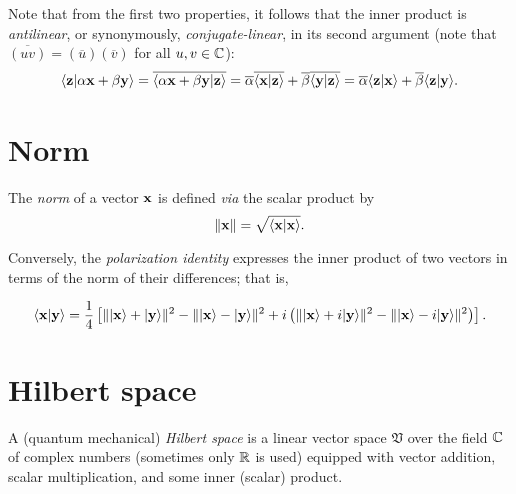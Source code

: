 Note that from the first two properties, it follows that the inner product is
{\em antilinear}, or synonymously,
{\em conjugate-linear}, in its second argument (note that $\overline{(uv)}=(\overline{u}) (\overline{v})$ for all $u,v\in {\Bbb C}$):
\begin{equation}
\begin{split}
 \langle  {\bf z} \vert \alpha {\bf x} + \beta {\bf y} \rangle
 =
 \overline{\langle \alpha {\bf x} + \beta {\bf y} \vert  {\bf z} \rangle }
 =
 \overline{ \alpha}\overline{\langle {\bf x} \vert  {\bf z}\rangle}
 + \overline{\beta }\overline{\langle {\bf y} \vert  {\bf z}\rangle}
 =
 \overline{\alpha} {\langle {\bf z}\vert {\bf x}\rangle}
 +\overline{\beta} {\langle {\bf z}\vert {\bf y}\rangle}
.
\end{split}
\end{equation}


\section{Norm}

 The {\em norm} of a vector ${\bf x}$
is defined {\it via} the scalar product by
\begin{equation}
\|
{\bf x}
\|
=\sqrt{\langle {\bf x}\vert {\bf x}\rangle }
.
\end{equation}

Conversely, the {\em polarization identity}
expresses the inner product of two vectors in terms of the norm of their differences; that is,

\begin{equation}
\langle {\bf x}\vert {\bf y}\rangle
=
\frac{1}{4}\left[
\| \vert  {\bf x}\rangle +\vert  {\bf y}\rangle  \|^2
-
\|\vert  {\bf x}\rangle - \vert {\bf y}\rangle  \|^2
+ i
\left(
\| \vert  {\bf x}\rangle + i\vert {\bf y}\rangle  \|^2
-
\| \vert  {\bf x}\rangle - i\vert {\bf y} \rangle \|^2
\right)
\right]
.
\label{2015-m-ch-polidc}
\end{equation}


\section{Hilbert space}


A (quantum mechanical) {\em Hilbert space}  is a linear
vector space ${\mathfrak V}$ over the field ${\Bbb C}$ of complex numbers
(sometimes only ${\Bbb R}$ is used)
equipped with vector addition, scalar multiplication, and some inner (scalar) product.

